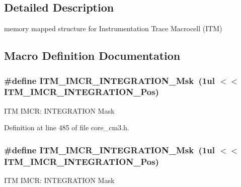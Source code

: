 \subsection{Detailed Description}
memory mapped structure for Instrumentation Trace Macrocell (I\+TM) 

\subsection{Macro Definition Documentation}
\subsubsection[{\texorpdfstring{I\+T\+M\+\_\+\+I\+M\+C\+R\+\_\+\+I\+N\+T\+E\+G\+R\+A\+T\+I\+O\+N\+\_\+\+Msk}{ITM_IMCR_INTEGRATION_Msk}}]{\setlength{\rightskip}{0pt plus 5cm}\#define I\+T\+M\+\_\+\+I\+M\+C\+R\+\_\+\+I\+N\+T\+E\+G\+R\+A\+T\+I\+O\+N\+\_\+\+Msk~(1ul $<$$<$ I\+T\+M\+\_\+\+I\+M\+C\+R\+\_\+\+I\+N\+T\+E\+G\+R\+A\+T\+I\+O\+N\+\_\+\+Pos)}\hypertarget{group___c_m_s_i_s___c_m3___i_t_m_ga8838bd3dd04c1a6be97cd946364a3fd2}{}\label{group___c_m_s_i_s___c_m3___i_t_m_ga8838bd3dd04c1a6be97cd946364a3fd2}
I\+TM I\+M\+CR\+: I\+N\+T\+E\+G\+R\+A\+T\+I\+ON Mask 

Definition at line 485 of file core\+\_\+cm3.\+h.

\subsubsection[{\texorpdfstring{I\+T\+M\+\_\+\+I\+M\+C\+R\+\_\+\+I\+N\+T\+E\+G\+R\+A\+T\+I\+O\+N\+\_\+\+Msk}{ITM_IMCR_INTEGRATION_Msk}}]{\setlength{\rightskip}{0pt plus 5cm}\#define I\+T\+M\+\_\+\+I\+M\+C\+R\+\_\+\+I\+N\+T\+E\+G\+R\+A\+T\+I\+O\+N\+\_\+\+Msk~(1ul $<$$<$ I\+T\+M\+\_\+\+I\+M\+C\+R\+\_\+\+I\+N\+T\+E\+G\+R\+A\+T\+I\+O\+N\+\_\+\+Pos)}\hypertarget{group___c_m_s_i_s___c_m3___i_t_m_ga8838bd3dd04c1a6be97cd946364a3fd2}{}\label{group___c_m_s_i_s___c_m3___i_t_m_ga8838bd3dd04c1a6be97cd946364a3fd2}
I\+TM I\+M\+CR\+: I\+N\+T\+E\+G\+R\+A\+T\+I\+ON Mask 

